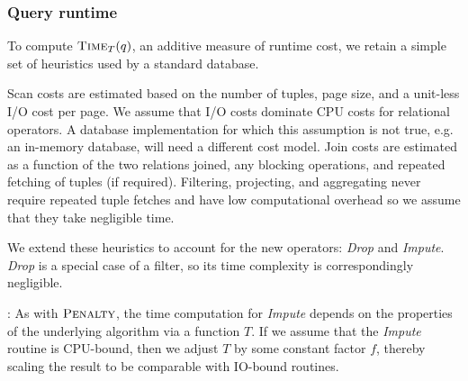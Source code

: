 {\subsubsection{Query runtime}
\label{sec:query-runtime}

To compute $\textsc{Time}_{T}(q)$, an additive measure of runtime cost, we retain a simple set of heuristics used by a standard database.


Scan costs are estimated based on the number of tuples, page size, and a unit-less I/O cost per page. 
We assume that I/O costs dominate CPU costs for relational operators. 
A database implementation for which this assumption is not true, e.g. an in-memory database, will need a different cost model.
Join costs are estimated as a function of the two relations joined, any blocking operations, and repeated fetching of tuples (if required).
Filtering, projecting, and aggregating never require repeated tuple fetches and have low computational overhead so we assume that they take negligible time.

We extend these heuristics to account for the new operators: \textit{Drop} and \textit{Impute}.
\textit{Drop} is a special case of a filter, so its time complexity is correspondingly negligible. 

:
As with $\textsc{Penalty}$, the time computation for \textit{Impute} depends on the properties of the underlying algorithm via a function $T$.
If we assume that the \textit{Impute} routine is CPU-bound, then we adjust $T$ by some constant factor $f$, thereby scaling the result to be comparable with IO-bound routines.

}
